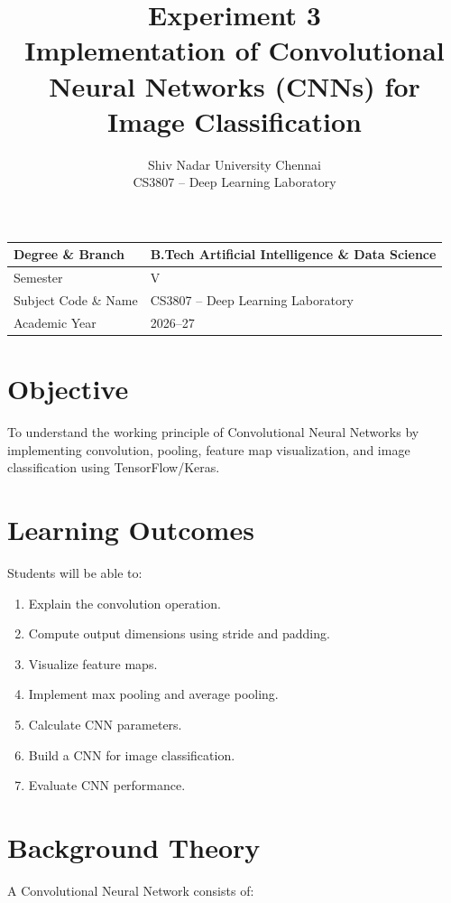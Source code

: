 \documentclass[12pt,a4paper]{article}
\title{\textbf{Experiment 3}\\
Implementation of Convolutional Neural Networks (CNNs) for Image Classification}
\author{
Shiv Nadar University Chennai\\
CS3807 -- Deep Learning Laboratory
}
\date{}
\begin{document}
\maketitle

\begin{center}
\begin{tabular}{|l|l|}
\hline
Degree \& Branch & B.Tech Artificial Intelligence \& Data Science \\ \hline
Semester & V \\ \hline
Subject Code \& Name & CS3807 -- Deep Learning Laboratory \\ \hline
Academic Year & 2026--27 \\ \hline
\end{tabular}
\end{center}

\section{Objective}

To understand the working principle of Convolutional Neural Networks by implementing convolution, pooling, feature map visualization, and image classification using TensorFlow/Keras.

\section{Learning Outcomes}

Students will be able to:

\begin{enumerate}
    \item Explain the convolution operation.
    \item Compute output dimensions using stride and padding.
    \item Visualize feature maps.
    \item Implement max pooling and average pooling.
    \item Calculate CNN parameters.
    \item Build a CNN for image classification.
    \item Evaluate CNN performance.
\end{enumerate}

\section{Background Theory}

A Convolutional Neural Network consists of:
\end{document}
